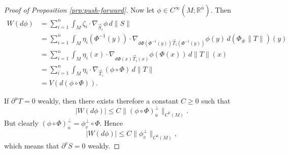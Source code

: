 \documentclass[10pt,a4paper]{amsart}
\newcommand{\R}{\mathbb{R}}
\newcommand{\ndim}{{\bar{n}}}
\begin{document}
\begin{proof}[Proof of Proposition \ref{prp:push-forward}]
Now let $\phi \in C^\infty(M; \R^\ndim)$. Then
\[
\begin{split}
W(d\phi) & = \sum_{i = 1}^n \int_M \zeta_i \cdot \nabla_{\vec{S}_i} \phi \, d\|S\| \\
& = \sum_{i = 1}^n \int_M \eta_i(\Phi^{-1}(y)) \cdot \nabla_{d\Phi(\Phi^{-1}(y)) \vec{T}_i(\Phi^{-1}(y))} \phi(y) \, d(\Phi_\# \|T\|)(y) \\
& = \sum_{i = 1}^n \int_M \eta_i(x) \cdot \nabla_{d\Phi(x) \vec{T}_i(x)} \phi(\Phi(x)) \, d\|T\|(x) \\
& = \sum_{i = 1}^n \int_M \eta_i \cdot \nabla_{\vec{T}_i} (\phi \circ \Phi) \, d\|T\| \\
& = V(d(\phi \circ \Phi)).
\end{split}
\]

If $\partial^u T = 0$ weakly, then there exists therefore a constant $C \ge 0$ such that
\[
|W(d\phi)| \le C\|(\phi \circ \Phi)_u^\perp\|_{C^0(M)}.
\]
But clearly $(\phi \circ \Phi)_u^\perp = \phi_v^\perp \circ \Phi$. Hence
\[
|W(d\phi)| \le C\|\phi_v^\perp\|_{C^0(M)},
\]
which means that $\partial^v S = 0$ weakly.
\end{proof}
\end{document}

